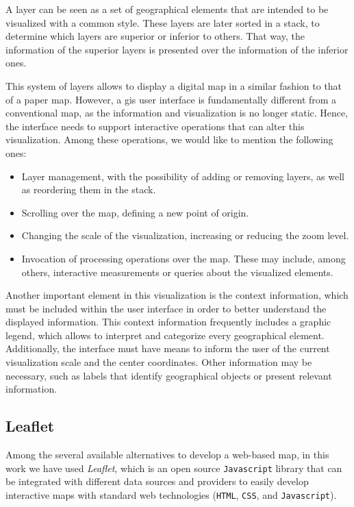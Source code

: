     A layer can be seen as a set of geographical elements that are intended to be visualized with a common style. These layers are later sorted in a stack, to determine which layers are superior or inferior to others. That way, the information of the superior layers is presented over the information of the inferior ones.
    
    This system of layers allows to display a digital map in a similar fashion to that of a paper map. However, a \gls{gis} user interface is fundamentally different from a conventional map, as the information and visualization is no longer static. Hence, the interface needs to support interactive operations that can alter this visualization. Among these operations, we would like to mention the following ones:
    
    \begin{itemize}
        \item Layer management, with the possibility of adding or removing layers, as well as reordering them in the stack.
        \item Scrolling over the map, defining a new point of origin.
        \item Changing the scale of the visualization, increasing or reducing the zoom level.
        \item Invocation of processing operations over the map. These may include, among others, interactive measurements or queries about the visualized elements.
    \end{itemize}
    
    Another important element in this visualization is the context information, which must be included within the user interface in order to better understand the displayed information. This context information frequently includes a graphic legend, which allows to interpret and categorize every geographical element. Additionally, the interface must have means to inform the user of the current visualization scale and the center coordinates. Other information may be necessary, such as labels that identify geographical objects or present relevant information.
    
    \subsection{Leaflet}
    Among the several available alternatives to develop a \mbox{web-based} map, in this work we have used {\em Leaflet}, which is an open source \texttt{Javascript} library that can be integrated with different data sources and providers to easily develop interactive maps with standard web technologies (\texttt{HTML}, \texttt{CSS}, and \texttt{Javascript}).
    
